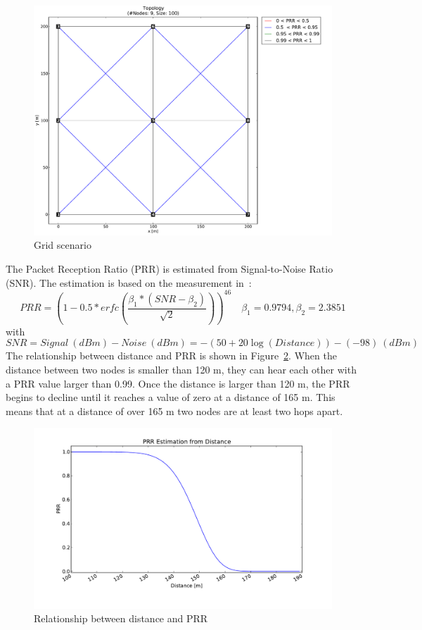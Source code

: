 \begin{figure}[htpb]	
  	\centering
    \leavevmode
      \includegraphics[scale=0.35]{Pics/results/topo9_dist100_grid.pdf}
    \caption{Grid scenario}
    \label{fig:scenario_grid}
\end{figure}

The Packet Reception Ratio (PRR) is estimated from Signal-to-Noise Ratio (SNR). The estimation is based on the measurement in~\cite{RL08}:
\[
PRR = (1-0.5*erfc(\frac{\beta_1*(SNR-\beta_2)}{\sqrt{2}}))^{46}
\quad{\beta_1} = 0.9794, {\beta_2} = 2.3851
\] 
with 
\[
SNR = Signal\:(dBm)- Noise\:(dBm) = -(50 + 20 {\log}(Distance)) - (-98)\:(dBm)
\] 
The relationship between distance and PRR is shown in Figure~\ref{fig:prr}. When the distance between two nodes is smaller than 120 m, they can hear each other with a PRR value larger than 0.99. Once the distance is larger than 120 m, the PRR begins to decline until it reaches a value of zero at a distance of 165 m. This means that at a distance of over 165 m two nodes are at least two hops apart.

\begin{figure}[htbp]
  \begin{center}
    \leavevmode
      \includegraphics[scale=0.45]{Pics/prr.pdf}
   \caption{Relationship between distance and PRR}
    \label{fig:prr}
  \end{center}
\end{figure}

